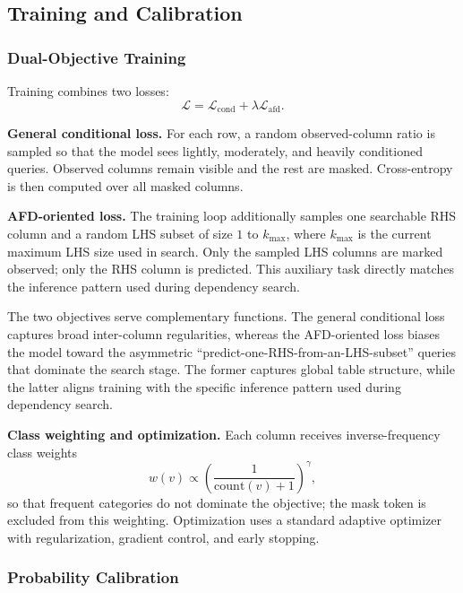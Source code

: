\documentclass[conference]{IEEEtran}
\begin{document}
\subsection{Training and Calibration}\label{sec:training}

\subsubsection{Dual-Objective Training}

Training combines two losses:
\begin{equation}
    \mathcal{L} = \mathcal{L}_{\mathrm{cond}} + \lambda \mathcal{L}_{\mathrm{afd}}.
\end{equation}

\textbf{General conditional loss.} For each row, a random observed-column ratio is sampled so that the model sees lightly, moderately, and heavily conditioned queries. Observed columns remain visible and the rest are masked. Cross-entropy is then computed over all masked columns.

\textbf{AFD-oriented loss.} The training loop additionally samples one searchable RHS column and a random LHS subset of size $1$ to $k_{\max}$, where $k_{\max}$ is the current maximum LHS size used in search. Only the sampled LHS columns are marked observed; only the RHS column is predicted. This auxiliary task directly matches the inference pattern used during dependency search.

The two objectives serve complementary functions. The general conditional loss captures broad inter-column regularities, whereas the AFD-oriented loss biases the model toward the asymmetric ``predict-one-RHS-from-an-LHS-subset'' queries that dominate the search stage. The former captures global table structure, while the latter aligns training with the specific inference pattern used during dependency search.

\textbf{Class weighting and optimization.} Each column receives inverse-frequency class weights
\begin{equation}
    w(v) \propto \left(\frac{1}{\mathrm{count}(v)+1}\right)^\gamma,
\end{equation}
so that frequent categories do not dominate the objective; the mask token is excluded from this weighting. Optimization uses a standard adaptive optimizer with regularization, gradient control, and early stopping.

\subsubsection{Probability Calibration}
\end{document}
